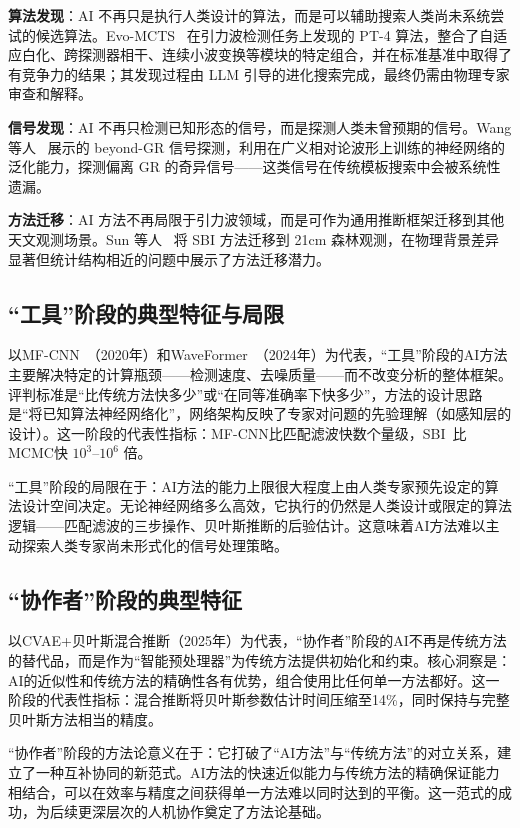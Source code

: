 \textbf{算法发现}：AI 不再只是执行人类设计的算法，而是可以辅助搜索人类尚未系统尝试的候选算法。Evo-MCTS~\cite{wang2025evomcts} 在引力波检测任务上发现的 PT-4 算法，整合了自适应白化、跨探测器相干、连续小波变换等模块的特定组合，并在标准基准中取得了有竞争力的结果；其发现过程由 LLM 引导的进化搜索完成，最终仍需由物理专家审查和解释。

\textbf{信号发现}：AI 不再只检测已知形态的信号，而是探测人类未曾预期的信号。Wang 等人~\cite{wang2025beyondgr} 展示的 beyond-GR 信号探测，利用在广义相对论波形上训练的神经网络的泛化能力，探测偏离 GR 的奇异信号——这类信号在传统模板搜索中会被系统性遗漏。

\textbf{方法迁移}：AI 方法不再局限于引力波领域，而是可作为通用推断框架迁移到其他天文观测场景。Sun 等人~\cite{sun2025_21cm} 将 SBI 方法迁移到 21cm 森林观测，在物理背景差异显著但统计结构相近的问题中展示了方法迁移潜力。

\subsection{“工具”阶段的典型特征与局限}

以MF-CNN~\cite{wang2020deeplearning}（2020年）和WaveFormer~\cite{wang2024waveformer}（2024年）为代表，“工具”阶段的AI方法主要解决特定的计算瓶颈——检测速度、去噪质量——而不改变分析的整体框架。评判标准是“比传统方法快多少”或“在同等准确率下快多少”，方法的设计思路是“将已知算法神经网络化”，网络架构反映了专家对问题的先验理解（如感知层的设计）。这一阶段的代表性指标：MF-CNN比匹配滤波快数个量级，SBI~\cite{liang2026sbireview}比MCMC快 $10^3$--$10^6$ 倍。

“工具”阶段的局限在于：AI方法的能力上限很大程度上由人类专家预先设定的算法设计空间决定。无论神经网络多么高效，它执行的仍然是人类设计或限定的算法逻辑——匹配滤波的三步操作、贝叶斯推断的后验估计。这意味着AI方法难以主动探索人类专家尚未形式化的信号处理策略。

\subsection{“协作者”阶段的典型特征}

以CVAE+贝叶斯混合推断（2025年）为代表，“协作者”阶段的AI不再是传统方法的替代品，而是作为“智能预处理器”为传统方法提供初始化和约束。核心洞察是：AI的近似性和传统方法的精确性各有优势，组合使用比任何单一方法都好。这一阶段的代表性指标：混合推断将贝叶斯参数估计时间压缩至14\%，同时保持与完整贝叶斯方法相当的精度。

“协作者”阶段的方法论意义在于：它打破了“AI方法”与“传统方法”的对立关系，建立了一种互补协同的新范式。AI方法的快速近似能力与传统方法的精确保证能力相结合，可以在效率与精度之间获得单一方法难以同时达到的平衡。这一范式的成功，为后续更深层次的人机协作奠定了方法论基础。

